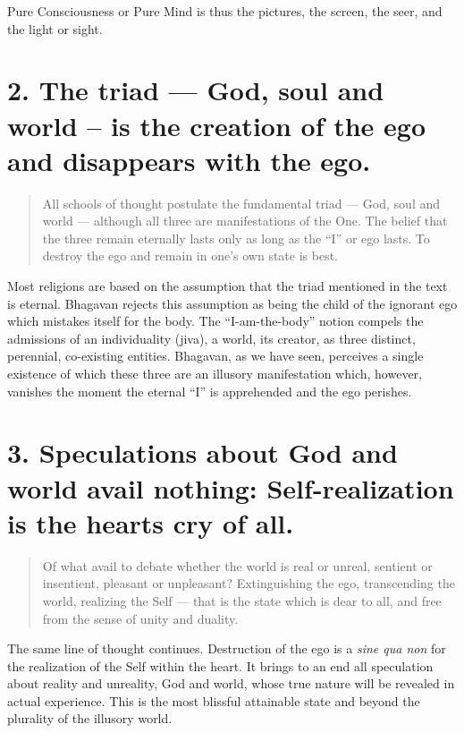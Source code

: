 \documentclass[12pt]{report}
\begin{document}
Pure Consciousness or Pure Mind is thus the pictures, the screen, the
seer, and the light or sight.

\section{2. The triad --- God, soul and world -- is the creation of
  the ego and disappears with the ego.}

\begin{quote}
  All schools of thought postulate the fundamental triad --- God, soul
  and world --- although all three are manifestations of the One. The
  belief that the three remain eternally lasts only as long as the ``I''
  or ego lasts. To destroy the ego and remain in one's own state is best.
\end{quote}


Most religions are based on the assumption that the triad mentioned in
the text is eternal. Bhagavan rejects this assumption as being the
child of the ignorant ego which mistakes itself for the body. The
``I-am-the-body'' notion compels the admissions of an individuality
(jiva), a world, its creator, as three distinct, perennial,
co-existing entities. Bhagavan, as we have seen, perceives a single
existence of which these three are an illusory manifestation which,
however, vanishes the moment the eternal ``I'' is apprehended and the
ego perishes.

\section{3. Speculations about God and world avail nothing:
  Self-realization is the hearts cry of all.}

\begin{quote}
  Of what avail to debate whether the world is real or unreal, sentient
  or insentient, pleasant or unpleasant? Extinguishing the ego,
  transcending the world, realizing the Self --- that is the state which
  is dear to all, and free from the sense of unity and duality.
\end{quote}


The same line of thought continues. Destruction of the ego is a
\emph{sine qua non} for the realization of the Self within the
heart. It brings to an end all speculation about reality and
unreality, God and world, whose true nature will be revealed in actual
experience. This is the most blissful attainable state and beyond the
plurality of the illusory world.
\end{document}
